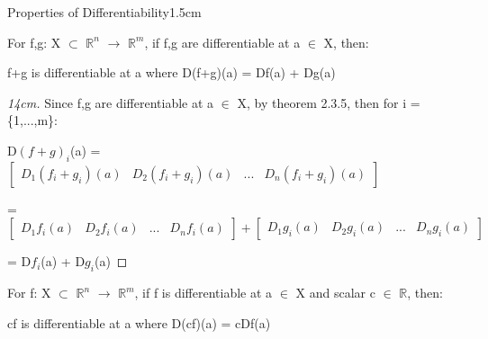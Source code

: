     \vspace{0.5cm}

    

    \begin{ltheorem}{Properties of Differentiability}{1.5cm}
        \item For f,g: X $\subset$ $\mathbb{R}^n$ $\rightarrow$ $\mathbb{R}^m$,
            if f,g are differentiable at a $\in$ X, then:

            \hspace{0.5cm}
            f+g is differentiable at a where D(f+g)(a) = Df(a) + Dg(a)

            \begin{proof}[14cm]
                Since f,g are differentiable at a $\in$ X,
                by {\color{red} theorem 2.3.5}, then for i = \{1,...,m\}:

                \hspace{0.5cm}
                D$(f+g)_i$(a) =
                $
                \begin{bmatrix}
                    D_1(f_i+g_i)(a)
                    & D_2(f_i+g_i)(a)
                    & ...
                    & D_n(f_i+g_i)(a)
                \end{bmatrix}
                $

                \hspace{0.5cm}
                = $
                \begin{bmatrix}
                    D_1f_i(a)
                    & D_2f_i(a)
                    & ...
                    & D_nf_i(a)
                \end{bmatrix}
                + \begin{bmatrix}
                    D_1g_i(a)
                    & D_2g_i(a)
                    & ...
                    & D_ng_i(a)
                \end{bmatrix}
                $

                \hspace{0.5cm}
                = D$f_i$(a) + D$g_i$(a)
            \end{proof}

        \item For f: X $\subset$ $\mathbb{R}^n$ $\rightarrow$ $\mathbb{R}^m$,
            if f is differentiable at a $\in$ X and scalar c $\in$ $\mathbb{R}$,
            then:

            \hspace{0.5cm}
            cf is differentiable at a where D(cf)(a) = cDf(a)


\end{ltheorem}
